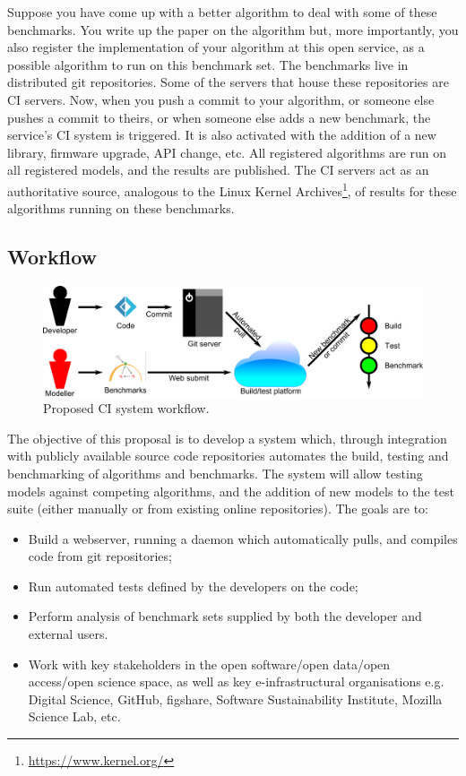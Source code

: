\documentclass[a4paper,11pt]{article}
\begin{document}
Suppose you have come up with a better algorithm to deal with some of
these benchmarks. You write up the paper on the algorithm but, more
importantly, you also register the implementation of your algorithm at
this open service, as a possible algorithm to run on this benchmark
set. The benchmarks live in distributed git 
repositories. Some of the servers that house these repositories are CI
servers. Now, when you push a commit to your algorithm, or someone
else pushes a commit to theirs, or when someone else adds a new
benchmark, the service's CI system is triggered. It is also activated
with the addition of a new library, firmware upgrade, API change,
etc. All registered algorithms are run on all registered models, and
the results are published. The CI servers act as an authoritative
source, analogous to the Linux Kernel
Archives\footnote{\url{https://www.kernel.org/}}, of results for these
algorithms running on these benchmarks.

\subsection*{Workflow}

\begin{figure}[!h]
\centering
\includegraphics[width=\columnwidth]{workflow.png}
\caption{Proposed CI system workflow.}
\label{fig:workflow}
\end{figure}

The objective of this proposal is to develop a system which, through
integration with publicly available source code repositories automates
the build, testing and benchmarking of algorithms and benchmarks. The 
system will allow testing models against competing algorithms, and the
addition of new models to the test suite (either manually or from existing
online repositories). The goals are to:

\begin{itemize}
	\item Build a webserver, running a daemon which automatically pulls, and compiles
code from git repositories;
\item Run automated tests defined by the developers on the code;
\item Perform analysis of benchmark sets supplied by both the developer and external
users.
\item Work with key stakeholders in the open software/open data/open access/open
  science space, as well as key e-infrastructural organisations
  e.g. Digital Science, GitHub, figshare, Software Sustainability
  Institute, Mozilla Science Lab, etc.
\end{itemize}
\end{document}
